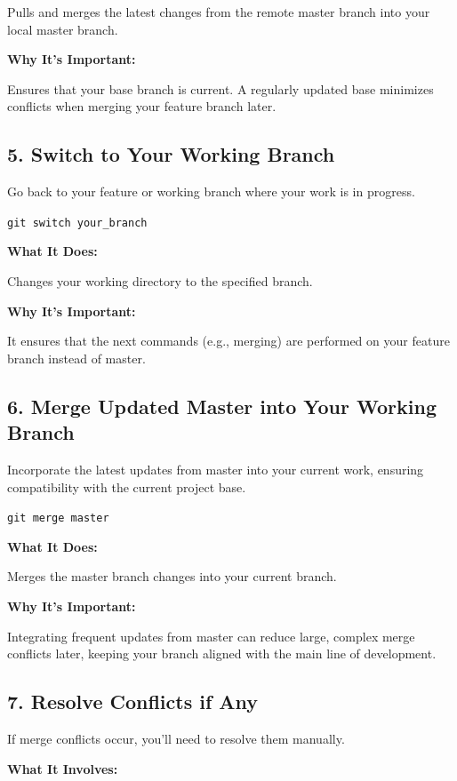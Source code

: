 \documentclass[
  letterpaper,
  DIV=11,
  numbers=noendperiod]{scrartcl}
\begin{document}
Pulls and merges the latest changes from the remote master branch into
your local master branch.

\textbf{Why It's Important:}

Ensures that your base branch is current. A regularly updated base
minimizes conflicts when merging your feature branch later.

\subsection{5. Switch to Your Working
Branch}\label{switch-to-your-working-branch}

Go back to your feature or working branch where your work is in
progress.

\texttt{git\ switch\ your\_branch}

\textbf{What It Does:}

Changes your working directory to the specified branch.

\textbf{Why It's Important:}

It ensures that the next commands (e.g., merging) are performed on your
feature branch instead of master.

\subsection{6. Merge Updated Master into Your Working
Branch}\label{merge-updated-master-into-your-working-branch}

Incorporate the latest updates from master into your current work,
ensuring compatibility with the current project base.

\texttt{git\ merge\ master}

\textbf{What It Does:}

Merges the master branch changes into your current branch.

\textbf{Why It's Important:}

Integrating frequent updates from master can reduce large, complex merge
conflicts later, keeping your branch aligned with the main line of
development.

\subsection{7. Resolve Conflicts if Any}\label{resolve-conflicts-if-any}

If merge conflicts occur, you'll need to resolve them manually.

\textbf{What It Involves:}
\end{document}
